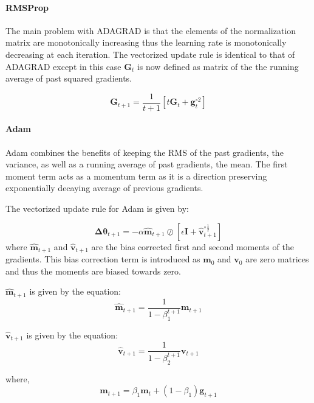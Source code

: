 \documentclass{article}
\begin{document}
\paragraph{RMSProp}
The main problem with ADAGRAD is that the elements of the normalization matrix are monotonically increasing thus the learning rate is monotonically decreasing at each iteration.
The vectorized update rule is identical to that of ADAGRAD except in this case $\boldsymbol{G}_t$ is now defined as matrix of the the running average of past squared gradients.




\begin{equation}
\boldsymbol{G}_{t+1} = \frac{1}{t+1}[t\boldsymbol{G}_{t} + \boldsymbol{g}_{t}^{\circ{2}}]
\end{equation}
\paragraph{Adam}
Adam combines the benefits of keeping the RMS of the past gradients, the variance, as well as a running average of past gradients, the mean. The first moment term acts as a momentum term as it is a direction preserving exponentially decaying average of previous gradients.

The vectorized update rule for Adam is given by:

\begin{equation}
\boldsymbol{\Delta{\theta}}_{t+1} = -\alpha\boldsymbol{\hat{m}}_{t+1}\oslash{[\epsilon\boldsymbol{I} +\boldsymbol{\hat{v}}_{t+1}^{\circ\frac{1}{2}}]}
\end{equation}
where $\boldsymbol{\hat{m}}_{t+1}$ and $\boldsymbol{\hat{v}}_{t+1}$ are the bias corrected first and second moments of the gradients. This bias correction term is introduced as $\boldsymbol{m}_0$ and $\boldsymbol{v}_0$ are zero matrices and thus the moments are biased towards zero.

$\boldsymbol{\hat{m}}_{t+1}$ is given by the equation:
\begin{equation}
\boldsymbol{\hat{m}}_{t+1} = \frac{1}{1-\beta_1^{t+1}}\boldsymbol{m}_{t+1}
\end{equation}

$\boldsymbol{\hat{v}}_{t+1}$ is given by the equation:
\begin{equation}
\boldsymbol{\hat{v}}_{t+1} = \frac{1}{1-\beta_2^{t+1}}\boldsymbol{v}_{t+1}
\end{equation}

where,
\begin{equation}
\boldsymbol{m}_{t+1} = \beta_1\boldsymbol{m}_{t} + (1-\beta_1)\boldsymbol{g}_{t+1}
\end{equation}
\end{document}
